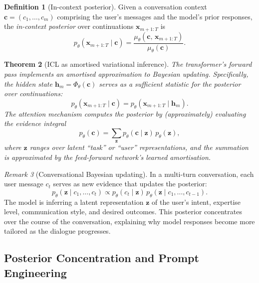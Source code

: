 \documentclass[11pt,a4paper]{article}
\theoremstyle{plain}
\newtheorem{theorem}{Theorem}[section]
\theoremstyle{definition}
\newtheorem{definition}[theorem]{Definition}
\theoremstyle{remark}
\newtheorem{remark}[theorem]{Remark}
\begin{document}
\begin{definition}[In-context posterior]
Given a conversation context $\bm{c} = (c_1, \ldots, c_m)$ comprising the
user's messages and the model's prior responses, the \emph{in-context posterior}
over continuations $\bm{x}_{m+1:T}$ is
\begin{equation}\label{eq:icl_posterior}
  p_\theta(\bm{x}_{m+1:T} \mid \bm{c})
  = \frac{\mu_\theta(\bm{c},\, \bm{x}_{m+1:T})}{\mu_\theta(\bm{c})}.
\end{equation}
\end{definition}

\begin{theorem}[ICL as amortised variational inference]\label{thm:icl}
The transformer's forward pass implements an \emph{amortised} approximation to
Bayesian updating. Specifically, the hidden state $\bm{h}_m = \Phi_\theta(\bm{c})$
serves as a \emph{sufficient statistic} for the posterior over continuations:
\[
  p_\theta(\bm{x}_{m+1:T} \mid \bm{c})
  = p_\theta(\bm{x}_{m+1:T} \mid \bm{h}_m).
\]
The attention mechanism computes the posterior by (approximately) evaluating the
evidence integral
\[
  p_\theta(\bm{c}) = \sum_{\bm{z}} p_\theta(\bm{c} \mid \bm{z})\, p_\theta(\bm{z}),
\]
where $\bm{z}$ ranges over latent ``task'' or ``user'' representations, and the
summation is approximated by the feed-forward network's learned amortisation.
\end{theorem}

\begin{remark}[Conversational Bayesian updating]
In a multi-turn conversation, each user message $c_t$ serves as new evidence
that updates the posterior:
\begin{equation}\label{eq:conv_update}
  p_\theta(\bm{z} \mid c_1, \ldots, c_t)
  \propto p_\theta(c_t \mid \bm{z})\, p_\theta(\bm{z} \mid c_1, \ldots, c_{t-1}).
\end{equation}
The model is inferring a latent representation $\bm{z}$ of the user's intent,
expertise level, communication style, and desired outcomes. This posterior
concentrates over the course of the conversation, explaining why model responses
become more tailored as the dialogue progresses.
\end{remark}

\subsection{Posterior Concentration and Prompt Engineering}
\end{document}
